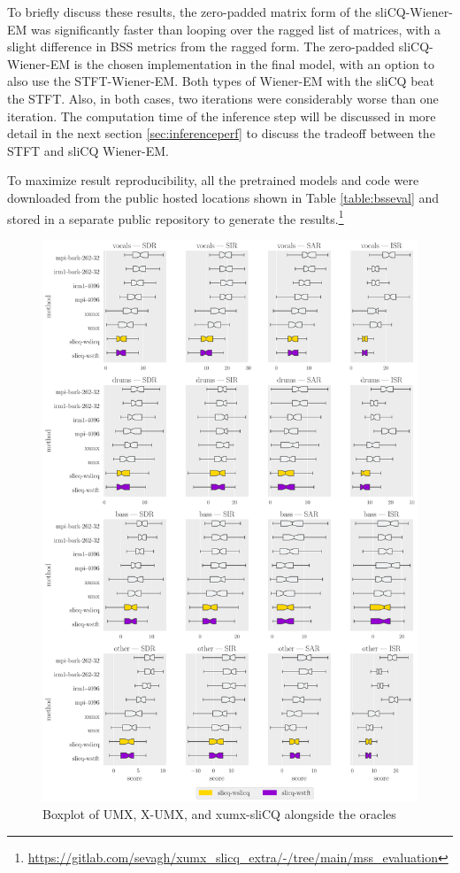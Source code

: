\documentclass[report.tex]{subfiles}
\begin{document}
To briefly discuss these results, the zero-padded matrix form of the sliCQ-Wiener-EM was significantly faster than looping over the ragged list of matrices, with a slight difference in BSS metrics from the ragged form. The zero-padded sliCQ-Wiener-EM is the chosen implementation in the final model, with an option to also use the STFT-Wiener-EM. Both types of Wiener-EM with the sliCQ beat the STFT. Also, in both cases, two iterations were considerably worse than one iteration. The computation time of the inference step will be discussed in more detail in the next section \ref{sec:inferenceperf} to discuss the tradeoff between the STFT and sliCQ Wiener-EM.

To maximize result reproducibility, all the pretrained models and code were downloaded from the public hosted locations shown in Table \ref{table:bsseval} and stored in a separate public repository to generate the results.\footnote{\url{https://gitlab.com/sevagh/xumx_slicq_extra/-/tree/main/mss_evaluation}}

\begin{figure}[ht]
	\centering
	\includegraphics[width=\textwidth]{./images-bss/boxplot_full.pdf}
	\caption{Boxplot of UMX, X-UMX, and xumx-sliCQ alongside the oracles}
	\label{fig:bssboxplot}
\end{figure}
\end{document}
